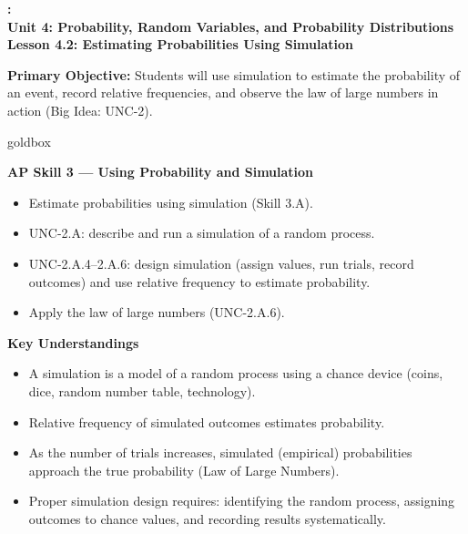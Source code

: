 \documentclass[10pt]{article}
\newcommand{\UnitNumberName}{Unit 4: Probability, Random Variables, and Probability Distributions \quad}
\newcommand{\LessonNumberName}{Lesson 4.2: Estimating Probabilities Using Simulation}
\begin{document}
\begin{center}
    {\Large\bfseries \CourseName: \SchoolYear \\
    {\small\bfseries \UnitNumberName \LessonNumberName}}
\end{center}

\begin{tcolorbox}[colback=sky, colframe=navy, boxrule=0.9pt, arc=2mm,
    left=2mm, right=2mm, top=1.5mm, bottom=1.5mm]
    \textbf{Primary Objective:} Students will use simulation to estimate the probability
    of an event, record relative frequencies, and observe the law of large numbers in action
    (Big Idea: UNC-2).
\end{tcolorbox}

\renewcommand{\arraystretch}{1.6}
\begin{skillbox}{goldbox}
\begin{minipage}[t]{0.48\linewidth}
    \textbf{AP Skill 3 --- Using Probability and Simulation}
    \begin{itemize}
        \item Estimate probabilities using simulation (Skill 3.A).
        \item UNC-2.A: describe and run a simulation of a random process.
        \item UNC-2.A.4--2.A.6: design simulation (assign values, run trials, record
              outcomes) and use relative frequency to estimate probability.
        \item Apply the law of large numbers (UNC-2.A.6).
    \end{itemize}
\end{minipage}
\hfill
\begin{minipage}[t]{0.48\linewidth}
    \textbf{Key Understandings}
    \begin{itemize}
        \item A simulation is a model of a random process using a chance device (coins,
              dice, random number table, technology).
        \item Relative frequency of simulated outcomes estimates probability.
        \item As the number of trials increases, simulated (empirical) probabilities
              approach the true probability (Law of Large Numbers).
        \item Proper simulation design requires: identifying the random process, assigning
              outcomes to chance values, and recording results systematically.
    \end{itemize}
\end{minipage}
\end{skillbox}
\end{document}

